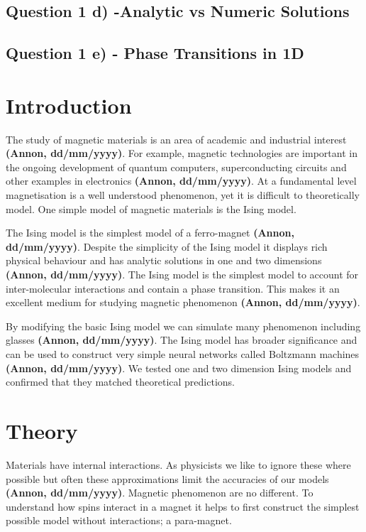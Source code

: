 \documentclass[a4paper]{article}
\def\citation{{\bfseries (Annon, dd/mm/yyyy)}}
\begin{document}
        \subsection*{Question 1 d) -Analytic vs Numeric Solutions}

        \subsection*{Question 1 e) - Phase Transitions in 1D}

        

    \begin{multicols}{2}
    \section*{Introduction}
        The study of magnetic materials is an area of academic %
        and industrial interest \citation. For example, magnetic %
        technologies are important in the ongoing development of %
        quantum computers, superconducting circuits and other %
        examples in electronics \citation. At a fundamental level %
        magnetisation is a well understood phenomenon, yet it is %
        difficult to theoretically model. One simple model of magnetic %
        materials is the Ising model. 


        The Ising model is the simplest model of a ferro-magnet \citation. %
        Despite the simplicity of the Ising model it displays rich %
        physical behaviour and has analytic solutions in one and %
        two dimensions \citation.  The Ising model is the simplest model %
        to account for inter-molecular interactions and contain a phase %
        transition. This makes it an excellent medium for studying %
        magnetic phenomenon \citation. 


        By modifying the basic Ising model we can simulate many %
        phenomenon including glasses \citation. The Ising model %
        has broader significance and can be used to construct very %
        simple neural networks called Boltzmann machines \citation. We tested %
        one and two dimension Ising models and confirmed that they %
        matched theoretical predictions.


    \section*{Theory}
        Materials have internal interactions. As physicists we like %
        to ignore these where possible but often these approximations %
        limit the accuracies of our models \citation. Magnetic %
        phenomenon are no different. To understand how spins interact %
        in a magnet it helps to first construct the simplest possible %
        model without interactions; a para-magnet.



\end{multicols}
\end{document}
